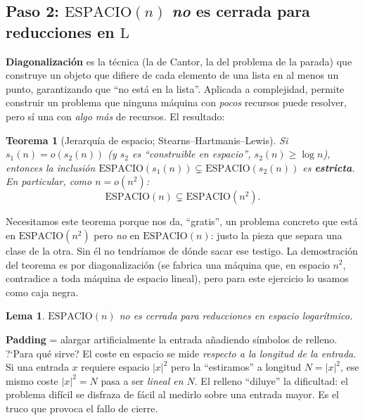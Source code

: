 \documentclass[11pt,a4paper]{article}
\theoremstyle{plain}
\newtheorem{teorema}{Teorema}
\newtheorem{lema}{Lema}
\theoremstyle{definition}
\newcommand{\Lclass}{\mathrm{L}}
\newcommand{\SPACE}{\mathrm{ESPACIO}}
\begin{document}
\subsection*{Paso 2: $\SPACE(n)$ \emph{no} es cerrada para reducciones en $\Lclass$}

\begin{concepto}
\textbf{Diagonalizaci\'on} es la t\'ecnica (la de Cantor, la del problema de la
parada) que construye un objeto que difiere de cada elemento de una lista en al menos
un punto, garantizando que ``no est\'a en la lista''. Aplicada a complejidad, permite
construir un problema que ninguna m\'aquina con \emph{pocos} recursos puede resolver,
pero s\'i una con \emph{algo m\'as} de recursos. El resultado:
\end{concepto}

\begin{teorema}[Jerarqu\'ia de espacio; Stearns--Hartmanis--Lewis]
Si $s_1(n)=o(s_2(n))$ (y $s_2$ es ``construible en espacio'', $s_2(n)\ge\log n$),
entonces la inclusi\'on $\SPACE(s_1(n))\subsetneq\SPACE(s_2(n))$ es
\textbf{estricta}. En particular, como $n=o(n^2)$:
\[
\SPACE(n)\subsetneq\SPACE(n^2).
\]
\end{teorema}

\begin{porque}
Necesitamos este teorema porque nos da, ``gratis'', un problema concreto que est\'a en
$\SPACE(n^2)$ pero \emph{no} en $\SPACE(n)$: justo la pieza que separa una clase de la
otra. Sin \'el no tendr\'iamos de d\'onde sacar ese testigo. La demostraci\'on del
teorema es por diagonalizaci\'on (se fabrica una m\'aquina que, en espacio $n^2$,
contradice a toda m\'aquina de espacio lineal), pero para este ejercicio lo usamos
como caja negra.
\end{porque}

\begin{lema}
$\SPACE(n)$ no es cerrada para reducciones en espacio logar\'itmico.
\end{lema}

\begin{concepto}
\textbf{Padding} = alargar artificialmente la entrada a\~nadiendo s\'imbolos de
relleno. ?`Para qu\'e sirve? El coste en espacio se mide \emph{respecto a la longitud
de la entrada}. Si una entrada $x$ requiere espacio $|x|^2$ pero la ``estiramos'' a
longitud $N=|x|^2$, ese mismo coste $|x|^2=N$ pasa a ser \emph{lineal en $N$}. El
relleno ``diluye'' la dificultad: el problema dif\'icil se disfraza de f\'acil al
medirlo sobre una entrada mayor. Es el truco que provoca el fallo de cierre.
\end{concepto}
\end{document}
